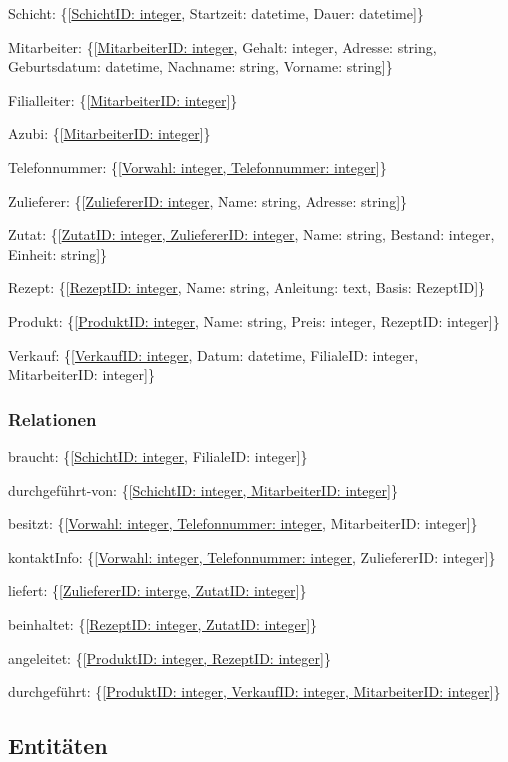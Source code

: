 \documentclass[a4paper]{article}
\begin{document}
Schicht: \{[\underline{SchichtID: integer}, Startzeit: datetime, Dauer: datetime]\}

Mitarbeiter: \{[\underline{MitarbeiterID: integer}, Gehalt: integer, Adresse: string, Geburtsdatum: datetime, Nachname: string, Vorname: string]\}

Filialleiter: \{[\underline{MitarbeiterID: integer}]\}

Azubi: \{[\underline{MitarbeiterID: integer}]\}

Telefonnummer: \{[\underline{Vorwahl: integer, Telefonnummer: integer}]\}

Zulieferer: \{[\underline{ZuliefererID: integer}, Name: string, Adresse: string]\}

Zutat: \{[\underline{ZutatID: integer, ZuliefererID: integer}, Name: string, Bestand: integer, Einheit: string]\}

Rezept: \{[\underline{RezeptID: integer}, Name: string, Anleitung: text, Basis: RezeptID]\}

Produkt: \{[\underline{ProduktID: integer}, Name: string, Preis: integer, RezeptID: integer]\}

Verkauf: \{[\underline{VerkaufID: integer}, Datum: datetime, FilialeID: integer, MitarbeiterID: integer]\}

\subsubsection{Relationen}

braucht: \{[\underline{SchichtID: integer}, FilialeID: integer]\}

durchgeführt-von: \{[\underline{SchichtID: integer, MitarbeiterID: integer}]\}

besitzt: \{[\underline{Vorwahl: integer, Telefonnummer: integer}, MitarbeiterID: integer]\}

kontaktInfo: \{[\underline{Vorwahl: integer, Telefonnummer: integer}, ZuliefererID: integer]\}

liefert: \{[\underline{ZuliefererID: interge, ZutatID: integer}]\}

beinhaltet: \{[\underline{RezeptID: integer, ZutatID: integer}]\}

angeleitet: \{[\underline{ProduktID: integer, RezeptID: integer}]\}

durchgeführt: \{[\underline{ProduktID: integer, VerkaufID: integer, MitarbeiterID: integer}]\}

\newpage
\subsection{Entitäten}
\end{document}

